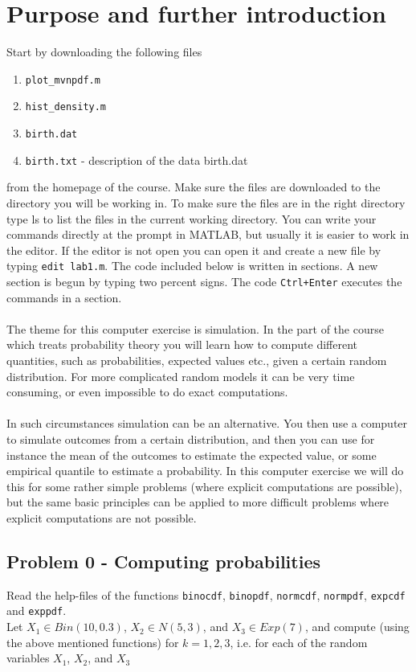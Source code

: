 \documentclass[letterpaper,12pt]{article}
\begin{document}
\section*{Purpose and further introduction}
Start by downloading the following files
\begin{enumerate}
    \item \texttt{plot\_mvnpdf.m}
    \item \texttt{hist\_density.m}
    \item \texttt{birth.dat}
    \item \texttt{birth.txt} - description of the data birth.dat
\end{enumerate}
from the homepage of the course. Make sure the files are downloaded to
the directory you will be working in. To make sure the files are in the right directory type ls to list the files in the current working directory. You can write your commands directly at the prompt in MATLAB, but usually it is easier to work in the editor. If the editor is not open you can open it and create a new file by typing \texttt{edit lab1.m}. The code included below is written in sections. A new section is begun by typing two percent signs. The code \texttt{Ctrl+Enter} executes the commands in a section.\\
\\
The theme for this computer exercise is simulation. In the part of the course which treats probability theory you will learn how to compute different quantities, such as probabilities, expected values etc., given a certain random distribution. For more complicated random models it can be very time consuming, or even impossible to do exact computations.\\
\\
In such circumstances simulation can be an alternative. You then use a computer to simulate outcomes from a certain distribution, and then you can use for instance the mean of the outcomes to estimate the expected value, or some empirical quantile to estimate a probability. In this computer exercise we will do this for some rather simple problems (where explicit computations are possible), but the same basic principles can be applied to more difficult problems where explicit computations are not possible.

\subsection*{Problem 0 - Computing probabilities}
Read the help-files of the functions \texttt{binocdf}, \texttt{binopdf}, \texttt{normcdf}, \texttt{normpdf}, \texttt{expcdf} and \texttt{exppdf}.\\
Let $X_{1} \in Bin(10, 0.3)$, $X_{2} \in N(5, 3)$, and $X_{3} \in Exp(7)$, and compute (using the above mentioned functions) for $k = 1, 2, 3$, i.e. for each of the random variables $X_{1}$, $X_{2}$, and $X_{3}$
\end{document}
